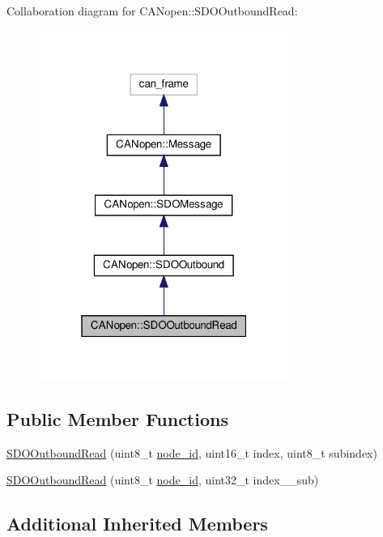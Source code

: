 Collaboration diagram for C\+A\+Nopen\+:\+:S\+D\+O\+Outbound\+Read\+:\nopagebreak
\begin{figure}[H]
\begin{center}
\leavevmode
\includegraphics[width=232pt]{class_c_a_nopen_1_1_s_d_o_outbound_read__coll__graph}
\end{center}
\end{figure}
\subsection*{Public Member Functions}
\begin{DoxyCompactItemize}
\item 
\hyperlink{class_c_a_nopen_1_1_s_d_o_outbound_read_a622eb7aa4300ebdcd74d7e50e5a7b6e3}{S\+D\+O\+Outbound\+Read} (uint8\+\_\+t \hyperlink{class_c_a_nopen_1_1_message_a845fe0c7682bd6eeef0a5dd87b5e3c63}{node\+\_\+id}, uint16\+\_\+t index, uint8\+\_\+t subindex)
\item 
\hyperlink{class_c_a_nopen_1_1_s_d_o_outbound_read_a888154f4196096357dad341b131ee81f}{S\+D\+O\+Outbound\+Read} (uint8\+\_\+t \hyperlink{class_c_a_nopen_1_1_message_a845fe0c7682bd6eeef0a5dd87b5e3c63}{node\+\_\+id}, uint32\+\_\+t index\+\_\+\+\_\+sub)
\end{DoxyCompactItemize}
\subsection*{Additional Inherited Members}


